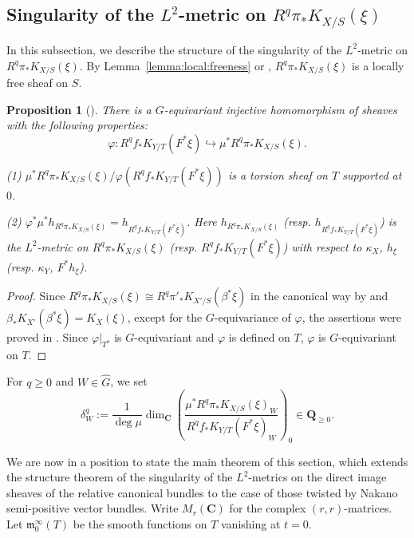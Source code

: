 \documentclass[amscd, leqno]{amsart}
\theoremstyle{plain}
\newtheorem{proposition}[theorem]{Proposition}
\theoremstyle{definition}
\theoremstyle{remark}
\newenvironment{pf}{\begin{proof}}{\end{proof}}
\begin{document}
\subsection
{Singularity of the $L^{2}$-metric on $R^{q}\pi_{*}K_{X/S}(\xi)$}
\label{sect:4.6}
\par
In this subsection, we describe the structure of the singularity of the $L^{2}$-metric on $R^{q}\pi_{*}K_{X/S}(\xi)$.
By Lemma~\ref{lemma:local:freeness} or \cite[Th.\,6.5 (i)]{Takegoshi95}, $R^{q}\pi_{*}K_{X/S}(\xi)$ is a locally free sheaf on $S$. 


\begin{proposition}[\cite{MourouganeTakayama09}]
\label{Proposition:MourouganeTakayama}
There is a $G$-equivariant injective homomorphism of sheaves with the following properties:
$$
\varphi \colon R^{q}f_{*} K_{Y/T}(F^{*}\xi) \hookrightarrow \mu^{*} R^{q}\pi_{*} K_{X/S}(\xi).
$$
\par\noindent
{\rm (1) }
$\mu^{*}R^{q}\pi_{*} K_{X/S}(\xi)/\varphi(R^{q}f_{*} K_{Y/T}(F^{*}\xi))$ is a torsion sheaf on $T$ supported at $0$.
\par\noindent
{\rm (2) }
$\varphi^{*}\mu^{*}h_{R^{q}\pi_{*} K_{X/S}(\xi)} = h_{R^{q}f_{*} K_{Y/T}(F^{*}\xi)}$.
Here $h_{R^{q}\pi_{*} K_{X/S}(\xi)}$ (resp. $h_{R^{q}f_{*} K_{Y/T}(F^{*}\xi)}$) is the $L^{2}$-metric on $R^{q}\pi_{*} K_{X/S}(\xi)$ 
(resp. $R^{q}f_{*} K_{Y/T}(F^{*}\xi)$) with respect to $\kappa_{X}$, $h_{\xi}$ (resp. $\kappa_{Y}$, $F^{*}h_{\xi}$).
\end{proposition}

\begin{pf}
Since $R^{q}\pi_{*} K_{X/S}(\xi) \cong R^{q}\pi'_{*} K_{X'/S}(\beta^{*}\xi)$ in the canonical way by \cite[Th.\,6.5 (i) ($\alpha$)]{Takegoshi95}
and $\beta_{*}K_{X'}(\beta^{*}\xi) = K_{X}(\xi)$,
except for the $G$-equivariance of $\varphi$, the assertions were proved in \cite[Lemmas 3.3 and 4.2]{MourouganeTakayama09}.
Since $\varphi|_{T^{o}}$ is $G$-equivariant and $\varphi$ is defined on $T$, $\varphi$ is $G$-equivariant on $T$.
\end{pf}


For $q\geq0$ and $W \in \widehat{G}$, we set
\begin{equation}
\label{eqn:length}
\delta_{W}^{q}
:=
\frac{1}{\deg \mu} \dim_{\mathbf C}\left( \frac{\mu^{*}R^{q}\pi_{*} K_{X/S}(\xi)_{W}}{R^{q}f_{*} K_{Y/T}(F^{*}\xi)_{W}} \right)_{0}
\in{\mathbf Q}_{\geq0}.
\end{equation}
\par
We are now in a position to state the main theorem of this section, which extends the structure theorem of the singularity of 
the $L^{2}$-metrics on the direct image sheaves of the relative canonical bundles \cite[Prop.\,2.10]{EFM21} 
to the case of those twisted by Nakano semi-positive vector bundles. Write $M_{r}({\mathbf C})$ for the complex $(r,r)$-matrices.
Let ${\mathfrak m}^{\infty}_{0}(T)$ be the smooth functions on $T$ vanishing at $t=0$.
\end{document}
